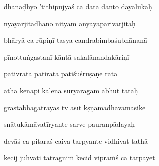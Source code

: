 dhanāḍhyo 'tithipūjyaś ca dātā dānto dayālukaḥ\thinspace{\dandab} \dontdisplaylinenum
{}

nyāyārjitadhano nityam anyāyaparivarjitaḥ \veg\dontdisplaylinenum
{}

bhāryā ca rūpiṇī tasya candrabimbaśubhānanā\thinspace{\dandab} \dontdisplaylinenum
{}

pīnottuṅgastanī kāntā sakalānandakāriṇī \danda\dontdisplaylinenum
{}

pativratā patiratā patiśuśrūṣaṇe ratā \veg\dontdisplaylinenum
{}

atha kenāpi kālena sūryarāgam abhūt tataḥ\thinspace{\dandab} \dontdisplaylinenum
{}

grastabhāgatrayas tv āsīt kṣṇamādhavamāsike \veg\dontdisplaylinenum

snātukāmāvatīryante sarve pauranpādayaḥ\thinspace{\dandab} \dontdisplaylinenum
{}

devāś ca pitaraś caiva tarpyante vidhivat tathā \veg\dontdisplaylinenum
{}

kecij juhvati tatrāgniṁ kecid viprāṁś ca tarpayet\thinspace{\dandab} \dontdisplaylinenum
{}

